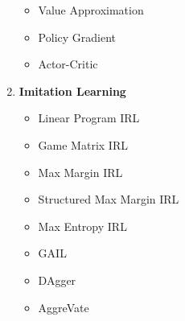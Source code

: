 \documentclass[11pt]{article}
\begin{document}
\begin{multicols}{2}
\begin{enumerate}
\begin{itemize}
        \item Value Approximation
        \item Policy Gradient
        \item Actor-Critic
    \end{itemize}
    \item \textbf{Imitation Learning}
    \begin{itemize}
        \item Linear Program IRL
        \item Game Matrix IRL
        \item Max Margin IRL
        \item Structured Max Margin IRL
        \item Max Entropy IRL
        \item GAIL
        \item DAgger
        \item AggreVate
    \end{itemize}
\end{enumerate}
\end{multicols}
 
{


}


\end{document}
